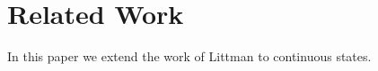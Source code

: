 \section{Related Work}
\label{sec:relatedwork}

In this paper we extend the work of Littman \cite{Littman_ICML_1994}
to continuous states.